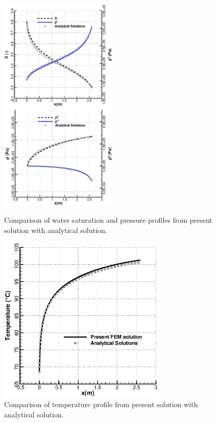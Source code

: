 \begin{figure}[!tbh]
\centerline{
\includegraphics[width=0.5\textwidth]{chapter_13/figures/fig_13_2_15_a}
\includegraphics[width=0.5\textwidth]{chapter_13/figures/fig_13_2_15_b}}
\caption{Comparison of water saturation and pressure profiles from present solution with analytical solution.}
\label{Fig:HP2}
\end{figure}

\begin{figure}[!tbh]
\begin{center}
\includegraphics[height=8cm]{chapter_13/figures/fig_13_2_16}
\end{center}
\caption{Comparison of temperature profile from present solution with analytical solution.}
\label{Fig:HP4}
\end{figure}

